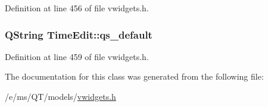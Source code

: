 Definition at line 456 of file vwidgets.h.

\hypertarget{classTimeEdit_a85056d246a80b2ee73c2303e7ca9b7cf}{
\subsubsection[{qs\_\-default}]{\setlength{\rightskip}{0pt plus 5cm}QString {\bf TimeEdit::qs\_\-default}}}
\label{classTimeEdit_a85056d246a80b2ee73c2303e7ca9b7cf}


Definition at line 459 of file vwidgets.h.



The documentation for this class was generated from the following file:\begin{DoxyCompactItemize}
\item 
/e/ms/QT/models/\hyperlink{vwidgets_8h}{vwidgets.h}\end{DoxyCompactItemize}
